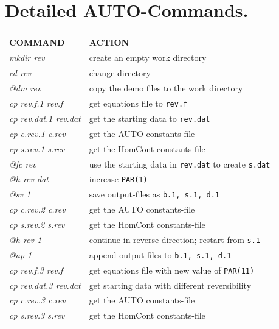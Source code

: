 \documentclass[12pt]{report}
\begin{document}
\section{ Detailed {\cal AUTO}-Commands.}
\begin{table}[htbp]
\begin{center}
\begin{tabular}{| l | l |}
\hline
  COMMAND  & ACTION \\
\hline
  {\it mkdir rev} & create an empty work directory \\ 
  {\it cd rev} & change directory \\
  {\it @dm rev} & copy the demo files to the work directory \\
\hline
  {\it cp rev.f.1 rev.f} &  get equations file to {\tt rev.f}\\
  {\it cp rev.dat.1 rev.dat} & get the starting data to {\tt rev.dat} \\ 
  {\it cp c.rev.1 c.rev} & get the AUTO constants-file \\ 
  {\it cp s.rev.1 s.rev} & get the HomCont constants-file \\ 
  {\it @fc rev} & use the starting data in {\tt rev.dat} to create {\tt s.dat} \\ 
  {\it @h rev dat} &  increase {\tt PAR(1)} \\ 
  {\it @sv 1} & save output-files as {\tt b.1, s.1, d.1} \\ 
\hline
  {\it cp c.rev.2 c.rev} & get the AUTO constants-file \\ 
  {\it cp s.rev.2 s.rev} & get the HomCont constants-file \\ 
  {\it @h rev 1} &  continue in reverse direction; restart from {\tt s.1} \\ 
  {\it @ap 1} & append output-files to {\tt b.1, s.1, d.1} \\ 
\hline
  {\it cp rev.f.3 rev.f} & get equations file with new value of {\tt PAR(11)}\\
  {\it cp rev.dat.3 rev.dat} & get starting data with different reversibility\\
  {\it cp c.rev.3 c.rev} & get the AUTO constants-file \\ 
  {\it cp s.rev.3 s.rev} & get the HomCont constants-file \\ 

\end{tabular}
\end{center}
\end{table}
\end{document}
